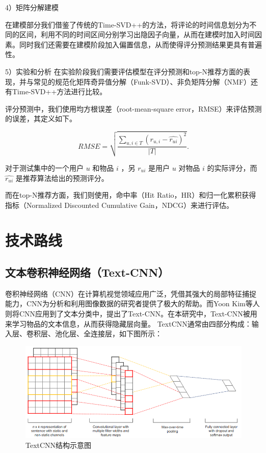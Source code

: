 4）矩阵分解建模

在建模部分我们借鉴了传统的Time-SVD++的方法，将评论的时间信息划分为不同的区间，利用不同的时间区间分别学习出隐因子向量，从而在建模时加入时间因素。同时我们还需要在建模阶段加入偏置信息，从而使得评分预测结果更具有普遍性。

5）实验和分析
在实验阶段我们需要评估模型在评分预测和top-N推荐方面的表现，并与常见的规范化矩阵奇异值分解（Funk-SVD）、非负矩阵分解（NMF）还有Time-SVD++方法进行比较。

评分预测中，我们使用均方根误差（root-mean-square error，RMSE）来评估预测的误差，其定义如下。

\begin{equation*}
RMSE = \sqrt{  \dfrac   {\sum\limits_{u,i \in T}  (r_{u,i} - \hat{r_{ui}}) ^2 } {|T|}   }.
\end{equation*}

对于测试集中的一个用户 $u$ 和物品 $i$ ，另 $r_{ui}$ 是用户 $u$ 对物品  $i$  的实际评分，而 $\hat{r_{ui}}$  是推荐算法给出的预测评分。

而在top-N推荐方面，我们则使用，命中率（Hit Ratio，HR）和归一化累积获得指标（Normalized Discounted Cumulative Gain，NDCG）来进行评估。

\chapter{技术路线}
\section{文本卷积神经网络（Text-CNN）}
卷积神经网络（CNN）在计算机视觉领域应用广泛，凭借其强大的局部特征捕捉能力，CNN为分析和利用图像数据的研究者提供了极大的帮助。而Yoon Kim等人\cite{Kim14fTextCNN}则将CNN应用到了文本分类中，提出了Text-CNN。在本研究中，Text-CNN被用来学习物品的文本信息，从而获得隐藏层向量。
TextCNN通常由四部分构成：输入层、卷积层、池化层、全连接层，如下图所示：

\begin{figure}[htbp]
\centering
\includegraphics[width=0.8\linewidth]{images/textCNN.png}
\caption{TextCNN结构示意图}
\label{fig:fig2}
\end{figure}



